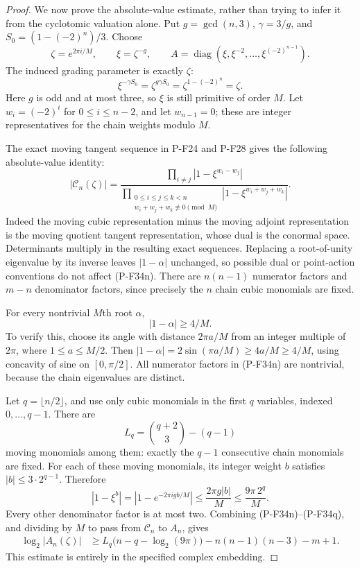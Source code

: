 \documentclass[11pt,a4paper]{article}
\begin{document}
\begin{proof}
We now prove the absolute-value estimate, rather than
trying to infer it from the cyclotomic valuation alone.
Put $g=\gcd(n,3)$, $\gamma=3/g$, and
$S_0=(1-(-2)^n)/3$. Choose
\[
 \zeta=e^{2\pi i/M},\qquad \xi=\zeta^{-g},\qquad
 A=\operatorname{diag}
        (\xi,\xi^{-2},\ldots,\xi^{(-2)^{n-1}}).
 \tag{P-F34m}
\]
The induced grading parameter is exactly $\zeta$:
\[
 \xi^{-\gamma S_0}=\zeta^{g\gamma S_0}
                 =\zeta^{1-(-2)^n}=\zeta.
\]
Here $g$ is odd and at most three, so $\xi$ is still
primitive of order $M$.
Let $w_i=(-2)^i$ for $0\le i\le n-2$, and let
$w_{n-1}=0$; these are integer representatives for the
chain weights modulo $M$.

The exact moving tangent sequence in P-F24 and P-F28
gives the following absolute-value identity:
\[
 |\mathcal C_n(\zeta)|
   =\frac{\displaystyle\prod_{i\ne j}
                     |1-\xi^{w_i-w_j}|}
          {\displaystyle\prod_{\substack{0\le i\le j\le k<n\\
                    w_i+w_j+w_k\not\equiv0\pmod M}}
                     |1-\xi^{w_i+w_j+w_k}|}.
 \tag{P-F34n}
\]
Indeed the moving cubic representation minus the moving
adjoint representation is the moving quotient tangent
representation, whose dual is the conormal space.
Determinants multiply in the resulting exact sequences.
Replacing a root-of-unity eigenvalue by its inverse
leaves $|1-\alpha|$ unchanged, so possible dual or
point-action conventions do not affect (P-F34n).
There are $n(n-1)$ numerator factors and $m-n$
denominator factors, since precisely the $n$ chain
cubic monomials are fixed.

For every nontrivial $M$th root $\alpha$,
\[
                         |1-\alpha|\ge4/M.
 \tag{P-F34o}
\]
To verify this, choose its angle with distance
$2\pi a/M$ from an integer multiple of $2\pi$,
where $1\le a\le M/2$. Then
$|1-\alpha|=2\sin(\pi a/M)\ge4a/M\ge4/M$,
using concavity of sine on $[0,\pi/2]$.
All numerator factors in (P-F34n) are nontrivial,
because the chain eigenvalues are distinct.

Let $q=\lfloor n/2\rfloor$, and use only cubic monomials
in the first $q$ variables, indexed $0,\ldots,q-1$.
There are
\[
 L_q=\binom{q+2}{3}-(q-1)
 \tag{P-F34p}
\]
moving monomials among them: exactly the $q-1$ consecutive
chain monomials are fixed. For each of these moving
monomials, its integer weight $b$ satisfies
$|b|\le3\cdot2^{q-1}$. Therefore
\[
 |1-\xi^b|=|1-e^{-2\pi igb/M}|
    \le \frac{2\pi g|b|}{M}
    \le \frac{9\pi\,2^q}{M}.
 \tag{P-F34q}
\]
Every other denominator factor is at most two.
Combining (P-F34n)--(P-F34q), and dividing by $M$
to pass from $\mathcal C_n$ to $A_n$, gives
\begin{align*}
 \log_2|A_n(\zeta)|
 &\ge L_q\bigl(n-q-\log_2(9\pi)\bigr)
       -n(n-1)(n-3)-m+1.
 \tag{P-F34r}
\end{align*}
This estimate is entirely in the specified complex
embedding.


\end{proof}
\end{document}
